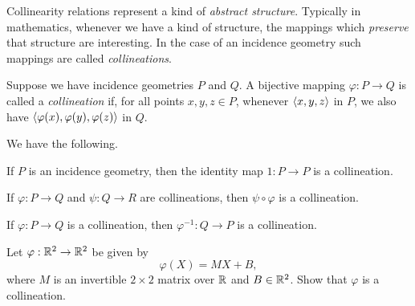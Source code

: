 Collinearity relations represent a kind of \emph{abstract structure}.
Typically in mathematics, whenever we have a kind of structure, the mappings which \emph{preserve} that structure are interesting.
In the case of an incidence geometry such mappings are called \emph{collineations}.

\begin{dfn}[Collineation]
Suppose we have incidence geometries \(P\) and \(Q\).
A bijective mapping \(\varphi : P \rightarrow Q\) is called a \emph{collineation} if, for all points \(x,y,z \in P\), whenever \(\langle x, y, z \rangle\) in \(P\), we also have \(\langle \varphi(x), \varphi(y), \varphi(z) \rangle\) in \(Q\).
\end{dfn}

\begin{prop}
We have the following.
\begin{proplist}
\item If \(P\) is an incidence geometry, then the identity map \(1 : P \rightarrow P\) is a collineation.
\item If \(\varphi : P \rightarrow Q\) and \(\psi : Q \rightarrow R\) are collineations, then \(\psi \circ \varphi\) is a collineation.
\item If \(\varphi : P \rightarrow Q\) is a collineation, then \(\varphi^{-1} : Q \rightarrow P\) is a collineation.
\end{proplist}
\end{prop}



\Exercises%

\begin{exercise}
Let \(\varphi : \mathbb{R}^2 \rightarrow \mathbb{R}^2\) be given by \[ \varphi(X) = MX + B, \]
where \(M\) is an invertible \(2 \times 2\) matrix over \(\mathbb{R}\) and \(B \in \mathbb{R}^2\).
Show that \(\varphi\) is a collineation.
\end{exercise}
